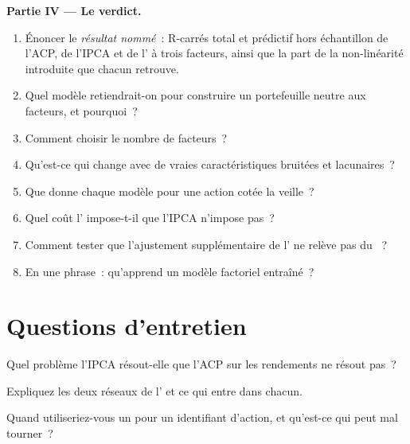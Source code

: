 \begin{problem}
\medskip\noindent\textbf{Partie IV --- Le verdict.}
\begin{enumerate}[resume]
\item Énoncer le \emph{résultat nommé}~: R-carrés total et prédictif hors échantillon de l'ACP, de l'IPCA et de l' à trois
facteurs, ainsi que la part de la non-linéarité introduite que chacun retrouve.
\item Quel modèle retiendrait-on pour construire un portefeuille neutre aux facteurs, et pourquoi~?
\item Comment choisir le nombre de facteurs~?
\item Qu'est-ce qui change avec de vraies caractéristiques bruitées et lacunaires~?
\item Que donne chaque modèle pour une action cotée la veille~?
\item Quel coût l' impose-t-il que l'IPCA n'impose pas~?
\item Comment tester que l'ajustement supplémentaire de l' ne relève pas du ~?
\item En une phrase~: qu'apprend un modèle factoriel entraîné~?
\end{enumerate}
\end{problem}

\section{Questions d'entretien}

\begin{interviewq}\label{iq:ml:cross-sectional-deep-models:1}
Quel problème l'IPCA résout-elle que l'ACP sur les rendements ne résout pas~?
\end{interviewq}

\begin{interviewq}\label{iq:ml:cross-sectional-deep-models:2}
Expliquez les deux réseaux de l' et ce qui entre dans chacun.
\end{interviewq}

\begin{interviewq}\label{iq:ml:cross-sectional-deep-models:3}
Quand utiliseriez-vous un  pour un identifiant d'action, et qu'est-ce qui peut mal tourner~?
\end{interviewq}

